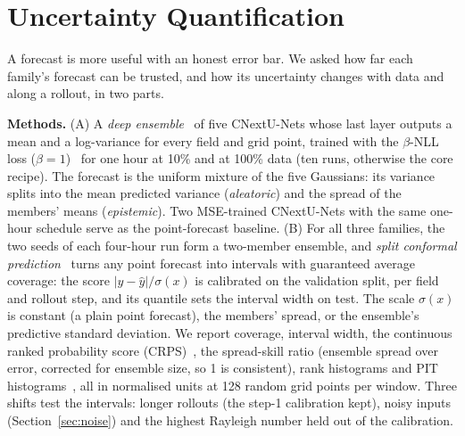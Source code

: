 \documentclass[11pt]{article}
\begin{document}
\section{Uncertainty Quantification}
\label{sec:uq}

A forecast is more useful with an honest error bar. We asked how far each family's forecast can be trusted, and how
its uncertainty changes with data and along a rollout, in two parts.

\textbf{Methods.} (A) A \emph{deep ensemble}~\cite{lakshminarayanan2017ensembles} of five CNextU-Nets whose last layer
outputs a mean and a log-variance for every field and grid point, trained with the $\beta$-NLL loss
($\beta=1$)~\cite{seitzer2022pitfalls} for one hour at 10\% and at 100\% data (ten runs, otherwise the core recipe).
The forecast is the uniform mixture of the five Gaussians: its variance splits into the mean predicted variance
(\emph{aleatoric}) and the spread of the members' means (\emph{epistemic}). Two MSE-trained CNextU-Nets with the same
one-hour schedule serve as the point-forecast baseline. (B) For all three families, the two seeds of each four-hour
run form a two-member ensemble, and \emph{split conformal prediction}~\cite{angelopoulos2021gentle} turns any point
forecast into intervals with guaranteed average coverage: the score $|y-\hat y|/\sigma(x)$ is calibrated on the
validation split, per field and rollout step, and its quantile sets the interval width on test. The scale $\sigma(x)$
is constant (a plain point forecast), the members' spread, or the ensemble's predictive standard deviation. We report
coverage, interval width, the continuous ranked probability score (CRPS)~\cite{gneiting2007scoring}, the spread-skill
ratio (ensemble spread over error, corrected for ensemble size, so 1 is consistent), rank histograms and PIT
histograms~\cite{hamill2001rank}, all in normalised units at 128 random grid points per window. Three shifts test the
intervals: longer rollouts (the step-1 calibration kept), noisy inputs (Section~\ref{sec:noise}) and the highest
Rayleigh number held out of the calibration.
\end{document}
